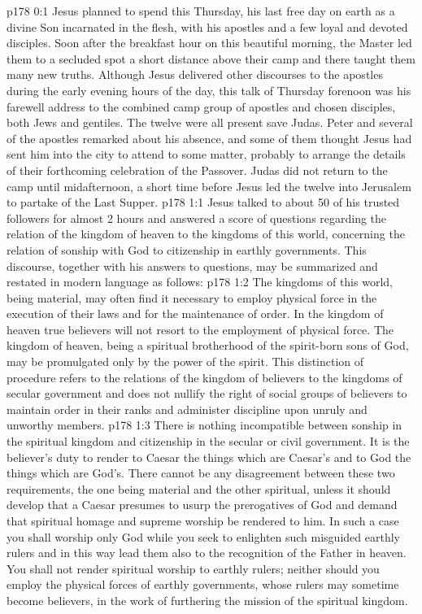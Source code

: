 \author{Midwayer Commission}
\vs p178 0:1 Jesus planned to spend this Thursday, his last free day on earth as a divine Son incarnated in the flesh, with his apostles and a few loyal and devoted disciples. Soon after the breakfast hour on this beautiful morning, the Master led them to a secluded spot a short distance above their camp and there taught them many new truths. Although Jesus delivered other discourses to the apostles during the early evening hours of the day, this talk of Thursday forenoon was his farewell address to the combined camp group of apostles and chosen disciples, both Jews and gentiles. The twelve were all present save Judas. Peter and several of the apostles remarked about his absence, and some of them thought Jesus had sent him into the city to attend to some matter, probably to arrange the details of their forthcoming celebration of the Passover. Judas did not return to the camp until midafternoon, a short time before Jesus led the twelve into Jerusalem to partake of the Last Supper.
\vs p178 1:1 Jesus talked to about 50 of his trusted followers for almost 2 hours and answered a score of questions regarding the relation of the kingdom of heaven to the kingdoms of this world, concerning the relation of sonship with God to citizenship in earthly governments. This discourse, together with his answers to questions, may be summarized and restated in modern language as follows:
\vs p178 1:2 \pc The kingdoms of this world, being material, may often find it necessary to employ physical force in the execution of their laws and for the maintenance of order. In the kingdom of heaven true believers will not resort to the employment of physical force. The kingdom of heaven, being a spiritual brotherhood of the spirit\hyp{}born sons of God, may be promulgated only by the power of the spirit. This distinction of procedure refers to the relations of the kingdom of believers to the kingdoms of secular government and does not nullify the right of social groups of believers to maintain order in their ranks and administer discipline upon unruly and unworthy members.
\vs p178 1:3 There is nothing incompatible between sonship in the spiritual kingdom and citizenship in the secular or civil government. It is the believer’s duty to render to Caesar the things which are Caesar’s and to God the things which are God’s. There cannot be any disagreement between these two requirements, the one being material and the other spiritual, unless it should develop that a Caesar presumes to usurp the prerogatives of God and demand that spiritual homage and supreme worship be rendered to him. In such a case you shall worship only God while you seek to enlighten such misguided earthly rulers and in this way lead them also to the recognition of the Father in heaven. You shall not render spiritual worship to earthly rulers; neither should you employ the physical forces of earthly governments, whose rulers may sometime become believers, in the work of furthering the mission of the spiritual kingdom.
